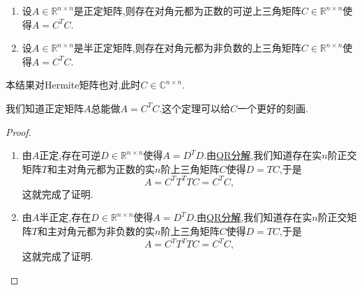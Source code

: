 \documentclass[../../main.tex]{subfiles}
\begin{document}
\begin{theorem}[(半)正定矩阵的Chelesky分解]\label{theorem:(半)正定矩阵的Chelesky分解}
\begin{enumerate}
\item 设\( A \in \mathbb{R}^{n \times n} \)是正定矩阵,则存在对角元都为正数的可逆上三角矩阵\( C \in \mathbb{R}^{n \times n} \)使得\( A = C^T C \).

\item 设\( A \in \mathbb{R}^{n \times n} \)是半正定矩阵,则存在对角元都为非负数的上三角矩阵\( C \in \mathbb{R}^{n \times n} \)使得\( A = C^T C \).
\end{enumerate}
\end{theorem}
\begin{note}
本结果对Hermite矩阵也对,此时\( C \in \mathbb{C}^{n \times n} \).

我们知道正定矩阵\( A \)总能做\( A = C^T C \).这个定理可以给\( C \)一个更好的刻画.
\end{note}
\begin{proof}
\begin{enumerate}
\item 由\( A \)正定,存在可逆\( D \in \mathbb{R}^{n \times n} \)使得\( A = D^T D \).由\hyperref[theorem:施密特正交化对应的矩阵分解,QR分解]{QR分解},我们知道存在实\( n \)阶正交矩阵\( T \)和主对角元都为正数的实\( n \)阶上三角矩阵\( C \)使得\( D = TC \),于是
\[
A = C^T T^T T C = C^T C,
\]
这就完成了证明.

\item 由\( A \)半正定,存在\( D \in \mathbb{R}^{n \times n} \)使得\( A = D^T D \).由\hyperref[theorem:施密特正交化对应的矩阵分解,QR分解]{QR分解},我们知道存在实\( n \)阶正交矩阵\( T \)和主对角元都为非负数的实\( n \)阶上三角矩阵\( C \)使得\( D = TC \),于是
\[
A = C^T T^T T C = C^T C,
\]
这就完成了证明.
\end{enumerate}

\end{proof}
\end{document}

